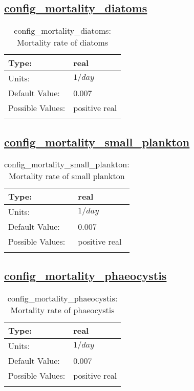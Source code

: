 \subsection[config\_mortality\_diatoms]{\hyperref[sec:nm_tab_biogeochemistry]{config\_mortality\_diatoms}}
\label{subsec:nm_sec_config_mortality_diatoms}
\begin{center}
\begin{longtable}{| p{2.0in} || p{4.0in} |}
    \hline
    Type: & real \\
    \hline
    Units: & $1/day$ \\
    \hline
    Default Value: & 0.007 \\
    \hline
    Possible Values: & positive real \\
    \hline
    \caption{config\_mortality\_diatoms: Mortality rate of diatoms}
\end{longtable}
\end{center}
\subsection[config\_mortality\_small\_plankton]{\hyperref[sec:nm_tab_biogeochemistry]{config\_mortality\_small\_plankton}}
\label{subsec:nm_sec_config_mortality_small_plankton}
\begin{center}
\begin{longtable}{| p{2.0in} || p{4.0in} |}
    \hline
    Type: & real \\
    \hline
    Units: & $1/day$ \\
    \hline
    Default Value: & 0.007 \\
    \hline
    Possible Values: & positive real \\
    \hline
    \caption{config\_mortality\_small\_plankton: Mortality rate of small plankton}
\end{longtable}
\end{center}
\subsection[config\_mortality\_phaeocystis]{\hyperref[sec:nm_tab_biogeochemistry]{config\_mortality\_phaeocystis}}
\label{subsec:nm_sec_config_mortality_phaeocystis}
\begin{center}
\begin{longtable}{| p{2.0in} || p{4.0in} |}
    \hline
    Type: & real \\
    \hline
    Units: & $1/day$ \\
    \hline
    Default Value: & 0.007 \\
    \hline
    Possible Values: & positive real \\
    \hline
    \caption{config\_mortality\_phaeocystis: Mortality rate of phaeocystis}
\end{longtable}
\end{center}
